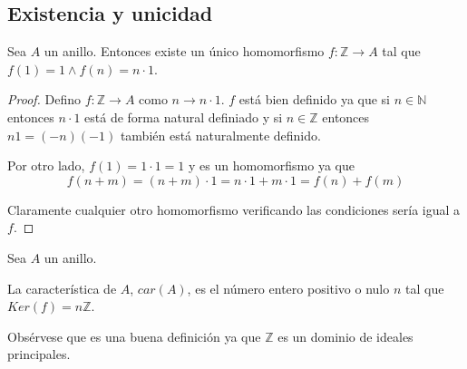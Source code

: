 \subsection{Existencia y unicidad}

\begin{proposition}
Sea $A$ un anillo. Entonces existe un único homomorfismo $f:\mathbb{Z} \to A$ tal que $f(1) = 1 \land f(n) = n \cdot 1$.
\end{proposition}
\begin{proof}
Defino $f: \mathbb{Z} \to A$ como $n \to n \cdot 1$. $f$ está bien definido ya que si $n \in \mathbb{N}$ entonces $n \cdot 1$ está de forma natural definiado y si $n \in \mathbb{Z}$ entonces $n1 = (-n)(-1)$ también está naturalmente definido. 

Por otro lado, $f(1) = 1 \cdot 1 = 1$ y es un homomorfismo ya que $$f(n+m) = (n+m) \cdot 1 = n \cdot 1 + m \cdot 1 = f(n) + f(m)$$

Claramente cualquier otro homomorfismo verificando las condiciones sería igual a $f$. 
\end{proof}

\begin{definition}
Sea $A$ un anillo.

La característica de $A$, $car(A)$, es el número entero positivo o nulo $n$ tal que $Ker(f) = n\mathbb{Z}$. 
\end{definition}

Obsérvese que es una buena definición ya que $\mathbb{Z}$ es un dominio de ideales principales.

